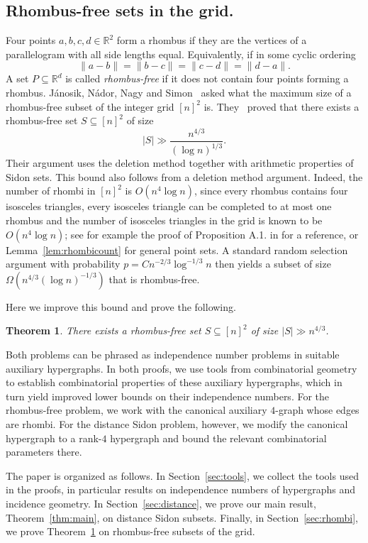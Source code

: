 \documentclass[11pt,oneside]{amsart}
\numberwithin{exercise}{subsection}
\newtheorem{theorem}{Theorem}
\begin{document}
\subsection*{Rhombus-free sets in the grid.}

Four points \(a,b,c,d \in \mathbb{R}^2\) form a rhombus if they are the vertices of a parallelogram with all side lengths equal. Equivalently, if in some cyclic ordering
\[
\|a-b\|=\|b-c\|=\|c-d\|=\|d-a\|.
\]
A set $P\subseteq \mathbb{R}^d$ is called \emph{rhombus-free} if it does not contain four points forming a rhombus. J\'anosik, N\'ador, Nagy and Simon~\cite{JanosikNadorNagySimon2026} asked what the maximum size of a rhombus-free subset of the integer grid $[n]^2$ is. They~\cite{JanosikNadorNagySimon2026} proved that there exists a rhombus-free set $S\subseteq [n]^2$ of size
\[
|S| \gg \frac{n^{4/3}}{(\log n)^{1/3}}.
\]
Their argument uses the deletion method together with arithmetic properties of Sidon sets. This bound also follows from a deletion method argument. Indeed, the number of rhombi in $[n]^2$ is $O(n^4\log n)$, since every rhombus contains four isosceles triangles, every isosceles triangle can be completed to at most one rhombus and the number of isosceles triangles in the grid is known to be $O(n^4\log n)$; see for example the proof of Proposition A.1. in \cite{Wagner} for a reference, or Lemma~\ref{lem:rhombicount} for general point sets. A standard random selection argument with probability $p=Cn^{-2/3}\log^{-1/3} n$ then yields a subset of size $\Omega(n^{4/3}(\log n)^{-1/3})$ that is rhombus-free.

Here we improve this bound and prove the following.

\begin{theorem}
\label{thm:rhomingrid}
There exists a rhombus-free set $S\subseteq [n]^2$ of size $|S| \gg n^{4/3}$.
\end{theorem}

Both problems can be phrased as independence number problems in suitable auxiliary hypergraphs. In both proofs, we use tools from combinatorial geometry to establish combinatorial properties of these auxiliary hypergraphs, which in turn yield improved lower bounds on their independence numbers. For the rhombus-free problem, we work with the canonical auxiliary $4$-graph whose edges are rhombi. For the distance Sidon problem, however, we modify the canonical hypergraph to a rank-$4$ hypergraph and bound the relevant combinatorial parameters there.

The paper is organized as follows. In Section~\ref{sec:tools}, we collect the tools used in the proofs, in particular results on independence numbers of hypergraphs and incidence geometry. In Section~\ref{sec:distance}, we prove our main result, Theorem~\ref{thm:main}, on distance Sidon subsets. Finally, in Section~\ref{sec:rhombi}, we prove Theorem~\ref{thm:rhomingrid} on rhombus-free subsets of the grid.
\end{document}
